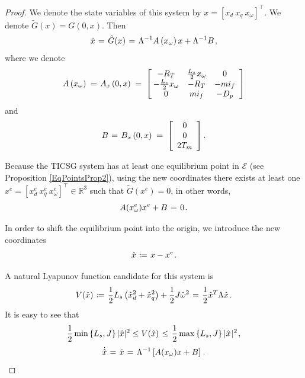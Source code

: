 \documentclass[letterpaper,10pt,conference]{ieeeconf}
\newcommand{\rline}  {{\mathbb R}}
\renewcommand{\L}    {{\Lambda}}
\renewcommand{\o}    {{\omega}}
\newcommand{\half}   {{\frac{1}{2}}}
\newcommand{\m}      {{\hbox{\hskip 1pt}}}
\newcommand{\nm}     {{\hbox{\hskip -3pt}}}
\newcommand{\Emscr}  {{\mathcal{E}}}
\begin{document}
\medskip
\begin{proof}
We denote the state variables of this system by $x=\left[x_d\ x_q\ 
x_\o\right]^\top$. We denote $\tilde G(x)=G(0,x)$. Then
$$ \dot{x} \m=\m \tilde{G}(x) \m=\m \L^{-1} A\left( x_\o \right)x +
   \L^{-1} B \m,$$
where we denote
$$ A\left( x_\o \right) \m=\m A_x\left(0,x\right) \m=\m \left[\nm
   \begin{array}{ccc} - R_T & \frac{L_s}{2} x_\o & 0\\ -\frac{L_s}{2}
   x_\o & -R_T & -mi_f\\ 0 & mi_f & -D_p \end{array}\right]$$
and
$$ B \m=\m B_x\left(0,x \right) \m=\m \left[\begin{array}{c} 
   0\\ 0\\ 2T_m \end{array}\right].$$

Because the TICSG system has at least one equilibrium point in
$\Emscr$ (see Proposition \ref{EqPointsProp2}), using the new
coordinates there exists at least one $x^e=\left[x_d^e\ x_q^e\ 
x_\o^e\right]^\top\in\rline^3$ such that $\tilde{G}(x^e)=0$, 
in other words, 
\begin{equation} \label{eq:G_at_equilibrium}
   A(x_\o^e) x^e + B \m=\m 0 \m.
\end{equation}

In order to shift the equilibrium point into the origin, we introduce
the new coordinates
$$\hat{x} \m\coloneqq\m x-x^e \m.$$

A natural Lyapunov function candidate for this system is 
$$ V(\hat{x}) \m\coloneqq\m \half L_s\left(\hat{x}_d^2+\hat{x}_q^2
   \right)+\half J\hat{\o}^2 \m=\m \half\hat{x}^T\L\hat{x} \m.$$
It is easy to see that
$$ \half \min\left\{L_{s},J\right\}|\hat{x}|{}^{2}\leq V(\hat{x})
   \m\leq\m \frac{1}{2} \max\left\{L_{s},J\right\}|\hat{x}\m
   |^{2} \m,$$
\begin{equation} \label{eq:x_hat_dynamic}
   \dot{\hat{x}} \m=\m \dot{x} \m=\m \L^{-1} \left[ A(x_\o) x+
   B \right] \m.
\end{equation}
 

\end{proof}
\end{document}
